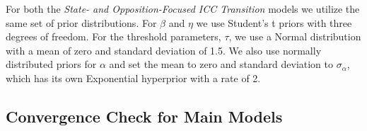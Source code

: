 For both the \emph{State- and Opposition-Focused ICC Transition} models we utilize the same set of prior distributions. For $\beta$ and $\eta$ we use Student's t priors with three degrees of freedom. For the threshold parameters, $\tau$, we use a Normal distribution with a mean of zero and standard deviation of 1.5. We also use normally distributed priors for $\alpha$ and set the mean to zero and standard deviation to $\sigma_{\alpha}$, which  has its own Exponential hyperprior with a rate of 2.

%
%
%
%
%

\subsection*{Convergence Check for Main Models}

